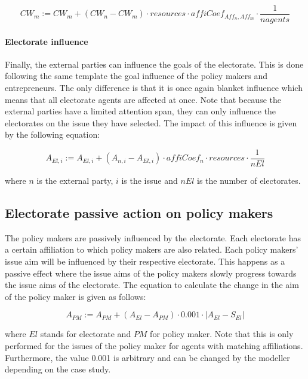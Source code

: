 \begin{equation}
CW_{m} := CW_{m} + \left( CW_{n} - CW_{m} \right) \cdot resources \cdot affiCoef_{Aff_n,Aff_m} \cdot \frac{1}{nagents}
\end{equation}

\paragraph{Electorate influence}

Finally, the external parties can influence the goals of the electorate. This is done following the same template the goal influence of the policy makers and entrepreneurs. The only difference is that it is once again blanket influence which means that all electorate agents are affected at once. Note that because the external parties have a limited attention span, they can only influence the electorates on the issue they have selected. The impact of this influence is given by the following equation:

\begin{equation}
A_{El, i} := A_{El, i} + \left(A_{n, i} - A_{El, i} \right) \cdot affiCoef_n \cdot resources \cdot \frac{1}{nEl}
\end{equation}

where $n$ is the external party, $i$ is the issue and $nEl$ is the number of electorates.

\subsection{Electorate passive action on policy makers}

The policy makers are passively influenced by the electorate. Each electorate has a certain affiliation to which policy makers are also related. Each policy makers' issue aim will be influenced by their respective electorate. This happens as a passive effect where the issue aims of the policy makers slowly progress towards the issue aims of the electorate. The equation to calculate the change in the aim of the policy maker is given as follows:

\begin{equation}
A_{PM} := A_{PM} + \left(A_{El} - A_{PM} \right) \cdot 0.001 \cdot \left| A_{El} - S_{El} \right|
\end{equation}

where $El$ stands for electorate and $PM$ for policy maker. Note that this is only performed for the issues of the policy maker for agents with matching affiliations. Furthermore, the value 0.001 is arbitrary and can be changed by the modeller depending on the case study.

